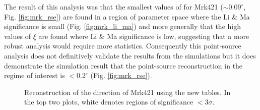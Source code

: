 \documentclass[main.tex]{subfiles}
\begin{document}
The result of this analysis was that the smallest values of \rse for Mrk421 ($\sim 0.09^\circ$, Fig. \ref{fig:mrk_rse}) are found in a region of parameter space where the Li \& Ma significance is small (Fig. \ref{fig:mrk_li_ma}) and more generally that the high values of $\xi$ are found where Li \& Ma significance is low, suggesting that a more robust analysis would require more statistics. Consequently this point-source analysis does not definitively validate the results from the simulations but it does demonstrate the simulation result that the point-source reconstruction in the regime of interest is $<0.2^\circ$ (Fig. \ref{fig:mrk_rse}).

\begin{figure}[H]
  \begin{center}
  \end{center}
  \caption[Mrk421 direction reconstruction using Method5t.]{Reconstruction of the direction of Mrk421 using the new \disp tables. In the top two plots, white denotes regions of significance $<3\sigma$.}
  \label{fig:mrk_disp}
\end{figure}

\end{document}
